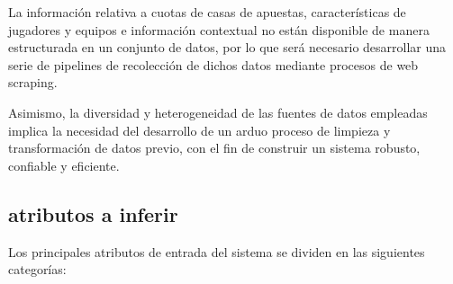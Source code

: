 La información relativa a cuotas de casas de apuestas, características de jugadores y equipos e información contextual no están disponible de manera estructurada en un conjunto de datos, por lo que será necesario desarrollar una serie de pipelines de recolección de dichos datos mediante procesos de web scraping. 

Asimismo, la diversidad y heterogeneidad de las fuentes de datos empleadas implica la necesidad del desarrollo de un arduo proceso de limpieza y transformación de datos previo, con el fin de construir un sistema robusto, confiable y eficiente. 

\subsection{atributos a inferir}


Los principales atributos de entrada del sistema se dividen en las siguientes categorías:

